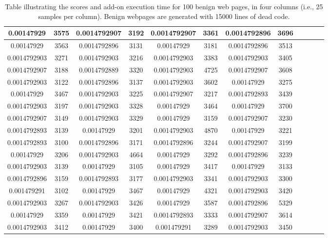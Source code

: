 \begin{table}[h]
\begin{tabular}{|c|c|c|c|c|c|c|c|c|c|c|c|}
\midrule
0.00147929&3575&0.0014792907&3192&0.0014792907&3361&0.0014792896&3696\\
\midrule
0.00147929&3563&0.0014792896&3131&0.00147929&3181&0.0014792896&3513\\
\midrule
0.0014792903&3271&0.0014792903&3216&0.0014792903&3383&0.0014792903&3405\\
\midrule
0.0014792907&3188&0.0014792889&3320&0.0014792903&4725&0.0014792907&3608\\
\midrule
0.0014792903&3122&0.0014792896&3137&0.0014792903&3602&0.00147929&3275\\
\midrule
0.00147929&3467&0.0014792903&3225&0.0014792907&3217&0.0014792893&3439\\
\midrule
0.0014792903&3197&0.0014792903&3328&0.00147929&3464&0.00147929&3700\\
\midrule
0.0014792907&3149&0.0014792903&3329&0.00147929&3159&0.0014792907&3230\\
\midrule
0.0014792893&3139&0.00147929&3201&0.0014792903&4870&0.00147929&3221\\
\midrule
0.0014792893&3100&0.0014792896&3171&0.0014792896&3244&0.0014792907&3199\\
\midrule
0.00147929&3206&0.0014792903&4664&0.00147929&3292&0.0014792896&3239\\
\midrule
0.0014792903&3139&0.00147929&3105&0.00147929&3417&0.00147929&3133\\
\midrule
0.0014792896&3159&0.0014792893&3177&0.0014792903&3341&0.0014792903&3300\\
\midrule
0.001479291&3102&0.00147929&3467&0.00147929&4321&0.0014792903&3420\\
\midrule
0.0014792903&3267&0.0014792903&3426&0.00147929&3587&0.0014792896&5329\\
\midrule
0.00147929&3359&0.00147929&3421&0.0014792893&3333&0.0014792907&3614\\
\midrule
0.0014792903&3412&0.00147929&3400&0.001479291&3289&0.0014792903&3450\\
\midrule
\end{tabular}
\caption[Scores table of benign web pages]{Table illustrating the scores and add-on execution time for 100 benign web pages, in four columns (i.e., 25 samples per column). Benign webpages are generated with 15000 lines of dead code.}    \label{tab:b15000table}
\end{table}

